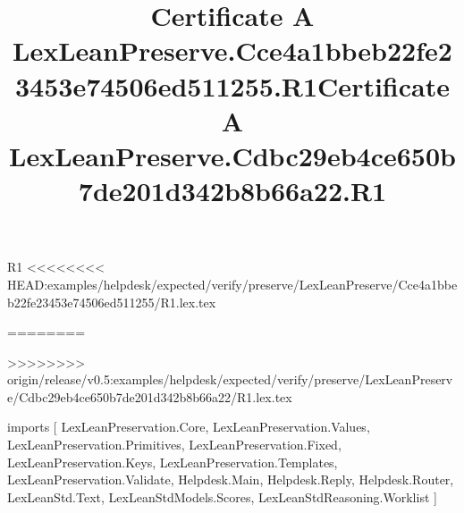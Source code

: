\begin{lexlean}{R1}
<<<<<<<< HEAD:examples/helpdesk/expected/verify/preserve/LexLeanPreserve/Cce4a1bbeb22fe23453e74506ed511255/R1.lex.tex
\title{Certificate A LexLeanPreserve.Cce4a1bbeb22fe23453e74506ed511255.R1}
========
\title{Certificate A LexLeanPreserve.Cdbc29eb4ce650b7de201d342b8b66a22.R1}
>>>>>>>> origin/release/v0.5:examples/helpdesk/expected/verify/preserve/LexLeanPreserve/Cdbc29eb4ce650b7de201d342b8b66a22/R1.lex.tex
\begin{coremodule}
imports [
  LexLeanPreservation.Core,
  LexLeanPreservation.Values,
  LexLeanPreservation.Primitives,
  LexLeanPreservation.Fixed,
  LexLeanPreservation.Keys,
  LexLeanPreservation.Templates,
  LexLeanPreservation.Validate,
  Helpdesk.Main,
  Helpdesk.Reply,
  Helpdesk.Router,
  LexLeanStd.Text,
  LexLeanStdModels.Scores,
  LexLeanStdReasoning.Worklist
]


\end{coremodule}
\end{lexlean}
